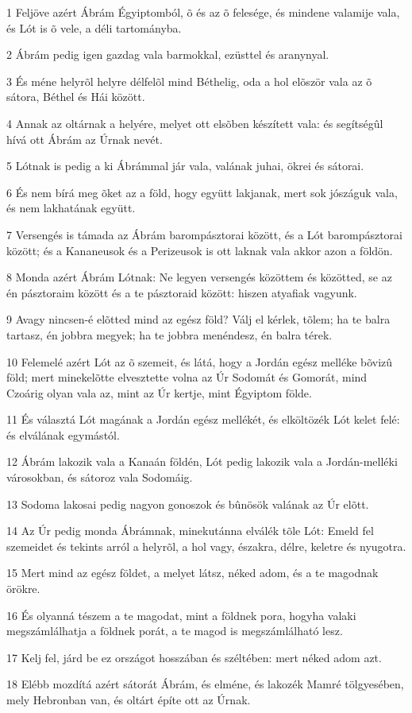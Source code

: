 \par 1 Feljöve azért Ábrám Égyiptomból, õ és az õ felesége, és mindene valamije vala, és Lót is õ vele, a déli tartományba.
\par 2 Ábrám pedig igen gazdag vala barmokkal, ezüsttel és aranynyal.
\par 3 És méne helyrõl helyre délfelõl mind Béthelig, oda a hol elõször vala az õ sátora, Béthel és Hái között.
\par 4 Annak az oltárnak a helyére, melyet ott elsõben készített vala: és segítségûl hívá ott Ábrám az Úrnak nevét.
\par 5 Lótnak is pedig a ki Ábrámmal jár vala, valának juhai, ökrei és sátorai.
\par 6 És nem bírá meg õket az a föld, hogy együtt lakjanak, mert sok jószáguk vala, és nem lakhatának együtt.
\par 7 Versengés is támada az Ábrám barompásztorai között, és a Lót barompásztorai között; és a Kananeusok és a Perizeusok is ott laknak vala akkor azon a földön.
\par 8 Monda azért Ábrám Lótnak: Ne legyen versengés közöttem és közötted, se az én pásztoraim között és a te pásztoraid között: hiszen atyafiak vagyunk.
\par 9 Avagy nincsen-é elõtted mind az egész föld? Válj el kérlek, tõlem; ha te balra tartasz, én jobbra megyek; ha te jobbra menéndesz, én balra térek.
\par 10 Felemelé azért Lót az õ szemeit, és látá, hogy a Jordán egész melléke bõvizû föld; mert minekelõtte elvesztette volna az Úr Sodomát és Gomorát, mind Czoárig olyan vala az, mint az Úr kertje, mint Égyiptom földe.
\par 11 És választá Lót magának a Jordán egész mellékét, és elköltözék Lót kelet felé: és elválának egymástól.
\par 12 Ábrám lakozik vala a Kanaán földén, Lót pedig lakozik vala a Jordán-melléki városokban, és sátoroz vala Sodomáig.
\par 13 Sodoma lakosai pedig nagyon gonoszok és bûnösök valának az Úr elõtt.
\par 14 Az Úr pedig monda Ábrámnak, minekutánna elválék tõle Lót: Emeld fel szemeidet és tekints arról a helyrõl, a hol vagy, északra, délre, keletre és nyugotra.
\par 15 Mert mind az egész földet, a melyet látsz, néked adom, és a te magodnak örökre.
\par 16 És olyanná tészem a te magodat, mint a földnek pora, hogyha valaki megszámlálhatja a földnek porát, a te magod is megszámlálható lesz.
\par 17 Kelj fel, járd be ez országot hosszában és széltében: mert néked adom azt.
\par 18 Elébb mozdítá azért sátorát Ábrám, és elméne, és lakozék Mamré tölgyesében, mely Hebronban van, és oltárt építe ott az Úrnak.

